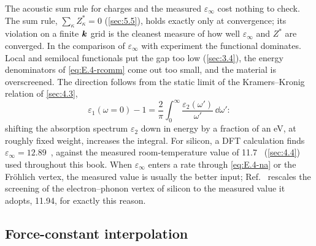The acoustic sum rule for charges and the measured $\varepsilon_\infty$ cost nothing to check. The sum rule, $\sum_\kappa Z^*_\kappa = 0$ (\cref{sec:5.5}), holds exactly only at convergence; its violation on a finite $\bm{k}$ grid is the cleanest measure of how well $\varepsilon_\infty$ and $Z^*$ are converged. In the comparison of $\varepsilon_\infty$ with experiment the functional dominates. Local and semilocal functionals put the gap too low (\cref{sec:3.4}), the energy denominators of \cref{eq:E.4-rcomm} come out too small, and the material is overscreened. The direction follows from the static limit of the Kramers--Kronig relation of \cref{sec:4.3},
\begin{equation}
  \varepsilon_1(\omega = 0) - 1 = \frac{2}{\pi}\int_0^\infty\frac{\varepsilon_2(\omega')}{\omega'}\,\dd\omega' :
  \label{eq:E.4-kk}
\end{equation}
shifting the absorption spectrum $\varepsilon_2$ down in energy by a fraction of an eV, at roughly fixed weight, increases the integral. For silicon, a DFT calculation finds $\varepsilon_\infty = 12.89$~\cite{ponce2018towards}, against the measured room-temperature value of 11.7~\cite{franta2017temperature} (\cref{sec:4.4}) used throughout this book. When $\varepsilon_\infty$ enters a rate through \cref{eq:E.4-na} or the Fr\"ohlich vertex, the measured value is usually the better input; Ref.~\cite{ponce2018towards} rescales the screening of the electron--phonon vertex of silicon to the measured value it adopts, 11.94, for exactly this reason.

\subsection{Force-constant interpolation}

